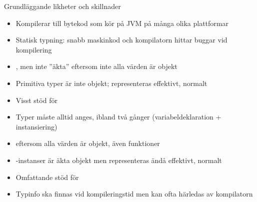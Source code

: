 


\begin{Slide}{Grundläggande likheter och skillnader}\SlideFontSmall
{}
\begin{itemize}\SlideFontTiny
\item Kompilerar till bytekod som kör på JVM på många olika plattformar
\item Statisk typning: snabb maskinkod och kompilatorn hittar buggar vid kompilering
\end{itemize}

 \vspace{-1em}
\begin{multicols}{2}
\begin{itemize}\SlideFontTiny
\item {}, men inte ''äkta''  eftersom inte alla värden är objekt

\item Primitiva typer är inte objekt; representeras effektivt, normalt 

\item Visst stöd för 

\item Typer måste alltid anges, ibland två gånger (variabeldeklaration + instansiering)
\end{itemize}

\columnbreak

\begin{itemize}\SlideFontTiny
\item {} eftersom alla värden är objekt, även funktioner

\item {}-instanser är äkta objekt men representeras ändå effektivt, normalt 

\item Omfattande stöd för 

\item Typinfo ska finnas vid kompileringstid men kan ofta härledas av kompilatorn
\end{itemize}

\end{multicols}
\end{Slide}




